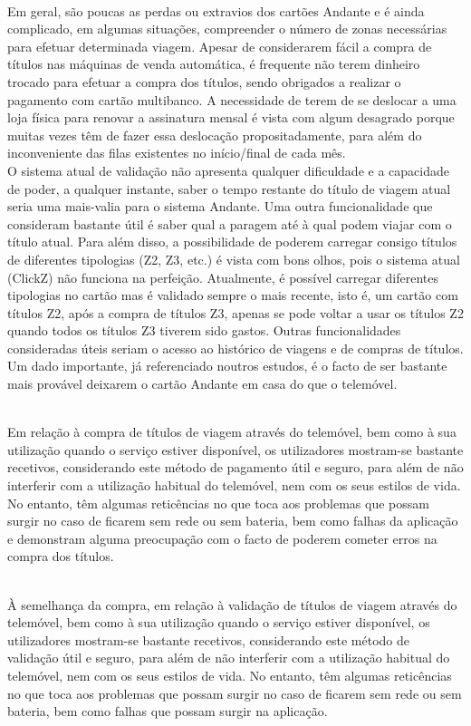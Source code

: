 ~\\Em geral, são poucas as perdas ou extravios dos cartões Andante e é ainda complicado, em algumas situações, compreender o número de zonas necessárias para efetuar determinada viagem. Apesar de considerarem fácil a compra de títulos nas máquinas de venda automática, é frequente não terem dinheiro trocado para efetuar a compra dos títulos, sendo obrigados a realizar o pagamento com cartão multibanco. A necessidade de terem de se deslocar a uma loja física para renovar a assinatura mensal é vista com algum desagrado porque muitas vezes têm de fazer essa deslocação propositadamente, para além do inconveniente das filas existentes no início/final de cada mês.
\\O sistema atual de validação não apresenta qualquer dificuldade e a capacidade de poder, a qualquer instante, saber o tempo restante do título de viagem atual seria uma mais-valia para o sistema Andante. Uma outra funcionalidade que consideram bastante útil é saber qual a paragem até à qual podem viajar com o título atual. Para além disso, a possibilidade de poderem carregar consigo títulos de diferentes tipologias (Z2, Z3, etc.) é vista com bons olhos, pois o sistema atual (ClickZ) não funciona na perfeição. Atualmente, é possível carregar diferentes tipologias no cartão mas é validado sempre o mais recente, isto é, um cartão com títulos Z2, após a compra de títulos Z3, apenas se pode voltar a usar os títulos Z2 quando todos os títulos Z3 tiverem sido gastos. Outras funcionalidades consideradas úteis seriam o acesso ao histórico de viagens e de compras de títulos.
\\Um dado importante, já referenciado noutros estudos, é o facto de ser bastante mais provável deixarem o cartão Andante em casa do que o telemóvel.

~\\Em relação à compra de títulos de viagem através do telemóvel, bem como à sua utilização quando o serviço estiver disponível, os utilizadores mostram-se bastante recetivos, considerando este método de pagamento útil e seguro, para além de não interferir com a utilização habitual do telemóvel, nem com os seus estilos de vida. No entanto, têm algumas reticências no que toca aos problemas que possam surgir no caso de ficarem sem rede ou sem bateria, bem como falhas da aplicação e demonstram alguma preocupação com o facto de poderem cometer erros na compra dos títulos.

~\\À semelhança da compra, em relação à validação de títulos de viagem através do telemóvel, bem como à sua utilização quando o serviço estiver disponível, os utilizadores mostram-se bastante recetivos, considerando este método de validação útil e seguro, para além de não interferir com a utilização habitual do telemóvel, nem com os seus estilos de vida. No entanto, têm algumas reticências no que toca aos problemas que possam surgir no caso de ficarem sem rede ou sem bateria, bem como falhas que possam surgir na aplicação.

